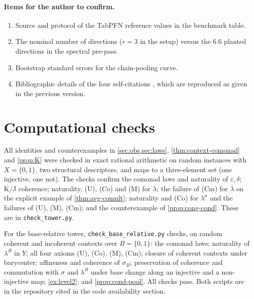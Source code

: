 \documentclass[11pt]{article}
\theoremstyle{definition}
\theoremstyle{remark}
\newcommand{\lb}{\bar\lambda}
\newcommand{\ls}{\lambda^{\sigma}}
\begin{document}
\paragraph{Items for the author to confirm.}
\begin{enumerate}[leftmargin=*,resume]
\item\label{it:tabpfn} Source and protocol of the TabPFN reference values in the benchmark table.
\item The nominal number of directions ($r=3$ in the setup) versus the $6.6$ planted directions in
  the spectral pre-pass.
\item Bootstrap standard errors for the chain-pooling curve.
\item Bibliographic details of the four self-citations
  \cite{Awasthi-CausalIDView,Awasthi-Hierarchy,Awasthi-Holonomy,Awasthi-ThreeLayers}, which are
  reproduced as given in the previous version.
\end{enumerate}

\section{Computational checks}

All identities and counterexamples in \cref{sec:obs,sec:laws}, \cref{thm:context-comonad} and
\cref{prop:K} were checked in exact rational arithmetic on random instances with $X=\{0,1\}$, two
structural descriptors, and maps to a three-element set (one injective, one not). The checks confirm
the comonad laws and naturality of $\varepsilon,\delta$; K/J coherence; naturality, (U), (Co) and (M)
for $\lb$; the failure of (Cm) for $\lb$ on the explicit example of \cref{thm:avg-comult}; naturality
and (Co) for $\ls$ and the failures of (U), (M), (Cm); and the counterexample of
\cref{prop:cong-cond}. These are in \texttt{check\_tower.py}.

For the base-relative tower, \texttt{check\_base\_relative.py} checks, on random coherent and
incoherent contexts over $B=\{0,1\}$: the comonad laws; naturality of $\lambda^B$ in $Y$; all four
axioms (U), (Co), (M), (Cm); closure of coherent contexts under barycenter; affineness and coherence
of $\sigma_B$; preservation of coherence and commutation with $\sigma$ and $\lambda^B$ under base change
along an injective and a non-injective map; \cref{ex:level2}; and \cref{prop:cond-pool}. All checks
pass. Both scripts are in the repository cited in the code availability section.
\end{document}
